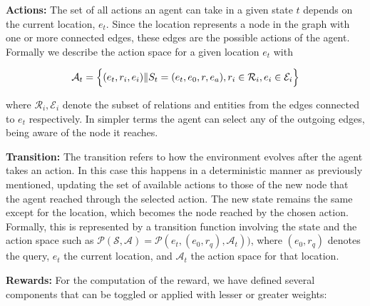 \textbf{Actions:} The set of all actions an agent can take in a given state $t$ depends on the current location, $e_t$. Since the location represents a node in the graph with one or more connected edges, these edges are the possible actions of the agent. Formally we describe the action space for a given location $e_t$ with 

\begin{equation}
\label{eq:ActionSpace}
\mathcal{A}_t  = \Bigl\{ (e_t,r_i,e_i)  \|  S_t = (e_t,e_0,r,e_a) , r_i \in   \mathcal{R}_i ,  e_i \in   \mathcal{E}_i  \Bigl\}
\end{equation}


where $\mathcal{R}_i,\mathcal{E}_i$ denote the subset of relations and entities from the edges connected to $e_{t}$ respectively. In simpler terms the agent can select any of the outgoing edges, being aware of the node it reaches.

\textbf{Transition:} The transition refers to how the environment evolves after the agent takes an action. In this case this happens in a deterministic manner as previously mentioned, updating the set of available actions to those of the new node that the agent reached through the selected action. The new state remains the same except for the location, which becomes the node reached by the chosen action. Formally, this is represented by a transition function involving the state and the action space such as $\mathcal{P}( \mathcal{S,A} ) = \mathcal{P}(e_t ,(e_0,r_q), \mathcal{A} _t))$, where $(e_0,r_q)$ denotes the query, $e_t$ the current location, and  $\mathcal{A}_t$ the action space for that location.

\textbf{Rewards:} For the computation of the reward, we have defined several components that can be toggled or applied with lesser or greater weights:

